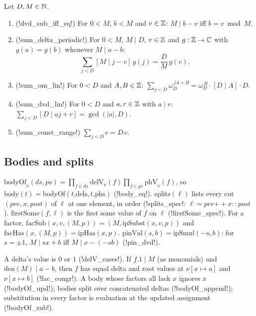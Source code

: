 \begin{theorem}\label{thm:lean-sym-range}
Let $D,M\in\mathbb{N}$.
\begin{enumerate}
\item (\lean!dvd_sub_iff_eq!) For $0<M$, $b<M$ and $v\in\mathbb{Z}$: $M\mid b-v$ iff $b=v\bmod M$.
\item (\lean!sum_delta_periodic!) For $0<M$, $M\mid D$, $v\in\mathbb{Z}$ and $g:\mathbb{Z}\to\mathbb{C}$ with $g(a)=g(b)$ whenever $M\mid a-b$:
\[
\sum_{j<D}[M\mid j-v]\,g(j)=\frac DM\,g(v).
\]
\item (\lean!sum_om_lin!) For $0<D$ and $A,B\in\mathbb{Z}$: $\displaystyle\sum_{j<D}\omega_D^{\,jA+B}=\omega_D^{\,B}\cdot[D\mid A]\cdot D$.
\item (\lean!sum_dvd_lin!) For $0<D$ and $a,r\in\mathbb{Z}$ with $a\mid r$: $\displaystyle\sum_{j<D}[D\mid aj+r]=\gcd(|a|,D)$.
\item (\lean!sum_const_range!) $\sum_{j<D}c=D\,c$.
\end{enumerate}
\end{theorem}

\subsection{Bodies and splits}

$\mathrm{bodyOf}_\nu(ds,ps)=\prod_{f\in ds}\mathrm{delV}_\nu(f)\prod_{f\in ps}\mathrm{phV}_\nu(f)$, so $\mathrm{body}(t)=\mathrm{bodyOf}(t.\mathrm{dels},t.\mathrm{phs})$ (\lean!body_eq!). $\mathrm{splits}(\ell)$ lists every cut $(\mathit{pre},x,\mathit{post})$ of $\ell$ at one element, in order (\lean!splits_spec!: $\ell=\mathit{pre}\mathbin{+\!\!+}x\mathbin{::}\mathit{post}$). $\mathrm{firstSome}(f,\ell)$ is the first $\mathrm{some}$ value of $f$ on $\ell$ (\lean!firstSome_spec!). For a factor, $\mathrm{facSub}(x,v,(M,p))=(M,\mathrm{ipSubst}(x,v,p))$ and $\mathrm{facHas}(x,(M,p))=\mathrm{ipHas}(x,p)$. $\mathrm{pinVal}(s,b)=\mathrm{ipSmul}(-s,b)$: for $s=\pm1$, $M\mid sx+b$ iff $M\mid x-(-sb)$ (\lean!pin_dvd!).

\begin{proposition}
A delta's value is $0$ or $1$ (\lean!delV_cases!). If $f.1\mid M$ (as monomials) and $\mathrm{den}(M)\mid a-b$, then $f$ has equal delta and root values at $\nu[x\mapsto a]$ and $\nu[x\mapsto b]$ (\lean!fac_congr!). A body whose factors all lack $x$ ignores $x$ (\lean!bodyOf_upd!); bodies split over concatenated deltas (\lean!bodyOf_append!); substitution in every factor is evaluation at the updated assignment (\lean!bodyOf_sub!).
\end{proposition}


